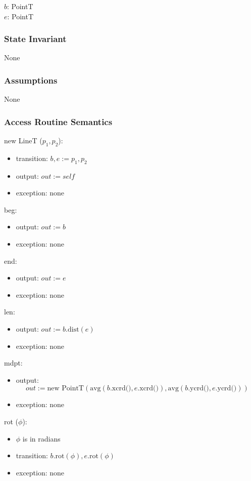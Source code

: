 \documentclass[12pt,fleqn]{article}
\begin{document}
$b$: PointT\\
$e$: PointT

\subsubsection* {State Invariant}
None

\subsubsection* {Assumptions}
None

\subsubsection* {Access Routine Semantics}

\noindent new LineT ($p_1, p_2$):
\begin{itemize}
\item transition: $b, e := p_1, p_2$
\item output: $out := \mathit{self}$
\item exception: none
\end{itemize}

\noindent beg:
\begin{itemize}
\item output: $out := b$
\item exception: none
\end{itemize}

\noindent end:
\begin{itemize}
\item output: $out := e$
\item exception: none
\end{itemize}

\noindent len:
\begin{itemize}
\item output: $out := b.\mbox{dist}(e)$
\item exception: none
\end{itemize}

\noindent mdpt:
\begin{itemize}
\item output:
  $$out := \mbox{new~} \mbox{PointT} (\mbox{avg}(b.\mbox{xcrd()},
  e.\mbox{xcrd()}), \mbox{avg}(b.\mbox{ycrd()}, e.\mbox{ycrd()}))$$
\item exception: none
\end{itemize}

\noindent rot ($\phi$):
\begin{itemize}
\item $\phi$ is in radians
\item transition: $b.\mbox{rot}(\phi), e.\mbox{rot}(\phi)$
\item exception: none
\end{itemize}
\end{document}
